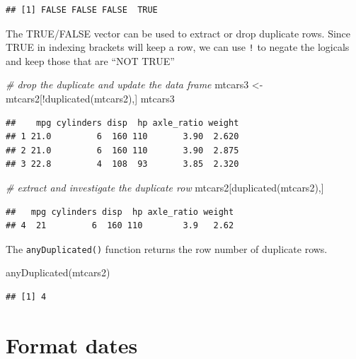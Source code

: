 \documentclass[
]{book}
\newenvironment{Shaded}{\begin{snugshade}}{\end{snugshade}}
\newcommand{\CommentTok}[1]{\textcolor[rgb]{0.56,0.35,0.01}{\textit{#1}}}
\newcommand{\FunctionTok}[1]{\textcolor[rgb]{0.00,0.00,0.00}{#1}}
\newcommand{\NormalTok}[1]{#1}
\newcommand{\OtherTok}[1]{\textcolor[rgb]{0.56,0.35,0.01}{#1}}
\newcommand{\SpecialCharTok}[1]{\textcolor[rgb]{0.00,0.00,0.00}{#1}}
\begin{document}
\begin{verbatim}
## [1] FALSE FALSE FALSE  TRUE
\end{verbatim}

The TRUE/FALSE vector can be used to extract or drop duplicate rows. Since TRUE in indexing brackets will keep a row, we can use \texttt{!} to negate the logicals and keep those that are ``NOT TRUE''

\begin{Shaded}
\begin{Highlighting}[]
\CommentTok{\# drop the duplicate and update the data frame}
\NormalTok{mtcars3 }\OtherTok{\textless{}{-}}\NormalTok{ mtcars2[}\SpecialCharTok{!}\FunctionTok{duplicated}\NormalTok{(mtcars2),]}
\NormalTok{mtcars3}
\end{Highlighting}
\end{Shaded}

\begin{verbatim}
##    mpg cylinders disp  hp axle_ratio weight
## 1 21.0         6  160 110       3.90  2.620
## 2 21.0         6  160 110       3.90  2.875
## 3 22.8         4  108  93       3.85  2.320
\end{verbatim}

\begin{Shaded}
\begin{Highlighting}[]
\CommentTok{\# extract and investigate the duplicate row}
\NormalTok{mtcars2[}\FunctionTok{duplicated}\NormalTok{(mtcars2),]}
\end{Highlighting}
\end{Shaded}

\begin{verbatim}
##   mpg cylinders disp  hp axle_ratio weight
## 4  21         6  160 110        3.9   2.62
\end{verbatim}

The \texttt{anyDuplicated()} function returns the row number of duplicate rows.

\begin{Shaded}
\begin{Highlighting}[]
\FunctionTok{anyDuplicated}\NormalTok{(mtcars2)}
\end{Highlighting}
\end{Shaded}

\begin{verbatim}
## [1] 4
\end{verbatim}

\hypertarget{format-dates}{%
\section{Format dates}\label{format-dates}}
\end{document}
